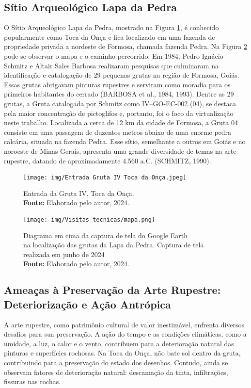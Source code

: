 \subsection {Sítio Arqueológico Lapa da Pedra}\label{sec:sitio lapa da pedra}
O Sítio Arqueológico Lapa da Pedra, mostrado na Figura \ref{fig:Entrada da Gruta IV,Toca da Onça}, é conhecido popularmente como Toca da Onça e fica localizado em uma fazenda de propriedade privada a nordeste de Formosa, chamada fazenda Pedra. Na Figura \ref{fig:mapa} pode-se observar o mapa e o caminho percorrido. Em 1984, Pedro Ignácio Schmitz e Altair Sales Barbosa realizaram pesquisas que culminaram na identificação e catalogação de 29 pequenas grutas na região de Formosa, Goiás. Essas grutas abrigavam pinturas rupestres e serviram como moradia para os primeiros habitantes do cerrado (BARBOSA et al., 1984, 1993).
Dentre as 29 grutas, a Gruta catalogada por Schmitz como IV–GO-EC-002 (04), se destaca pela maior concentração de pictoglifos e, portanto, foi o foco da virtualização neste trabalho. Localizada a cerca de 12 km da cidade de Formosa, a Gruta 04 consiste em uma passagem de duzentos metros abaixo de uma enorme pedra calcária, situada na fazenda Pedra. Esse sítio, semelhante a outros em Goiás e no noroeste de Minas Gerais, apresenta uma grande diversidade de temas na arte rupestre, datando de aproximadamente 4.560 a.C. (SCHMITZ, 1990).


\begin{figure}[H]
    \centering
    \texttt{[image: img/Entrada Gruta IV Toca da Onça.jpeg]}
    \caption{Entrada da Gruta IV, Toca da Onça. \\
        \textbf{Fonte:} Elaborado pelo autor, 2024.}
    \label{fig:Entrada da Gruta IV,Toca da Onça}
\end{figure}

\begin{figure}[H]
    \centering
    \texttt{[image: img/Visitas tecnicas/mapa.png]}
    \caption{ Diagrama em cima da captura de tela do Google Earth \\ na localização das grutas da Lapa da Pedra. Captura de tela realizada em junho de 2024 \\
        \textbf{Fonte:} Elaborado pelo autor, 2024.}
    \label{fig:mapa}
\end{figure}


\subsection{Ameaças à Preservação da Arte Rupestre: Deteriorização e Ação Antrópica}\label{sec:amecas a preservação}
A arte rupestre, como patrimônio cultural de valor inestimável, enfrenta diversos desafios para sua preservação. A ação do tempo e as condições climáticas, como a umidade, a luz, o calor e o vento, contribuem para a deterioração natural das pinturas e superfícies rochosas.
Na Toca da Onça,  não bate sol dentro da gruta, contribuindo para a preservação do estado dos desenhos. Contudo, ainda se observam fatores de deterioração natural: descamação da tinta, infiltrações, fissuras nas rochas.



